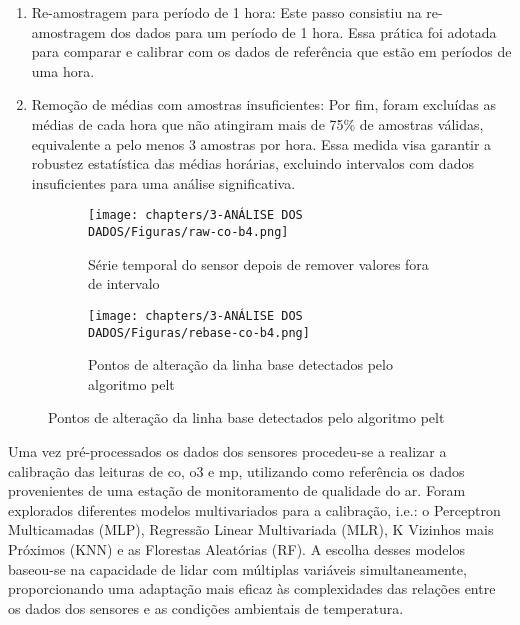 \begin{enumerate}
    \item Re-amostragem para período de 1 hora: Este passo consistiu na re-amostragem dos dados para um período de 1 hora. Essa prática foi adotada para comparar e calibrar com os dados de referência que estão em períodos de uma hora.
    \item Remoção de médias com amostras insuficientes: Por fim, foram excluídas as médias de cada hora que não atingiram mais de 75\% de amostras válidas, equivalente a pelo menos 3 amostras por hora. Essa medida visa garantir a robustez estatística das médias horárias, excluindo intervalos com dados insuficientes para uma análise significativa.
\end{enumerate}

\begin{figure}[h]
    \centering
    \caption{Série temporal do sensor CO-B4}
    \begin{subfigure}{0.495\textwidth}
        \texttt{[image: chapters/3-ANÁLISE DOS DADOS/Figuras/raw-co-b4.png]}
        \caption{Série temporal do sensor depois de remover valores fora de intervalo}
        \label{fig:data-co-raw}
    \end{subfigure}
    \hfill
    \begin{subfigure}{0.495\textwidth}
        \texttt{[image: chapters/3-ANÁLISE DOS DADOS/Figuras/rebase-co-b4.png]}
        \caption{Pontos de alteração da linha base detectados pelo algoritmo \acrshort{pelt}}
        \label{fig:data-rebase-co}
    \end{subfigure}
    \hfill
    \label{fig:data-co-raw-and-pelt}
\end{figure}

Uma vez pré-processados os dados dos sensores procedeu-se a realizar a calibração das leituras de \acrshort{co}, \acrshort{o3} e \acrshort{mp}, utilizando como referência os dados provenientes de uma estação de monitoramento de qualidade do ar. Foram explorados diferentes modelos multivariados para a calibração, i.e.: o Perceptron Multicamadas (MLP), Regressão Linear Multivariada (MLR), K Vizinhos mais Próximos (KNN) e as Florestas Aleatórias (RF). A escolha desses modelos baseou-se na capacidade de lidar com múltiplas variáveis simultaneamente, proporcionando uma adaptação mais eficaz às complexidades das relações entre os dados dos sensores e as condições ambientais de temperatura.

